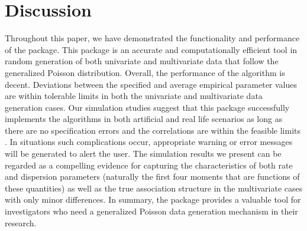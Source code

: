 \vspace*{-5mm}

\section{Discussion}

Throughout this paper, we have demonstrated the functionality and performance of the  package. This package is an accurate and computationally efficient tool in random generation of both univariate and multivariate data that follow the generalized Poisson distribution. Overall, the performance of the algorithm is decent. Deviations between the specified and average empirical parameter values are within tolerable limits in both the univariate and multivariate data generation cases. Our simulation studies suggest that this package successfully implements the algorithms in both artificial and real life scenarios as long as there are no specification errors and the correlations are within the feasible limits \citep{demirtas2011practical}. In situations such complications occur, appropriate warning or error messages will be generated to alert the user. The simulation results we present can be regarded as a compelling evidence for capturing the characteristics of both rate and dispersion parameters (naturally the first four moments that are functions of these quantities) as well as the true association structure in the multivariate cases with only minor differences. In summary, the  package provides a valuable tool for investigators who need a generalized Poisson data generation mechanism in their research.



\address{Hesen Li\\
  Ph.D. Student\\
  Division of Epidemiology and Biostatistics\\
  University of Illinois at Chicago\\
  Chicago, IL 60612, USA\\
  ORCID: 0000-0003-1636-299X\\}

\address{Dr. Hakan Demirtas\\
  Associate Professor of Biostatistics\\
  Division of Epidemiology and Biostatistics\\
  University of Illinois at Chicago\\
  Chicago, IL 60612, USA\\
  ORCID: 0000-0003-2482-703X\\}

\address{Ruizhe Chen\\
  Ph.D. Student\\
  Division of Epidemiology and Biostatistics\\
  University of Illinois at Chicago\\
  Chicago, IL 60612, USA\\
ORCID: 0000-0003-3924-3328\\}


